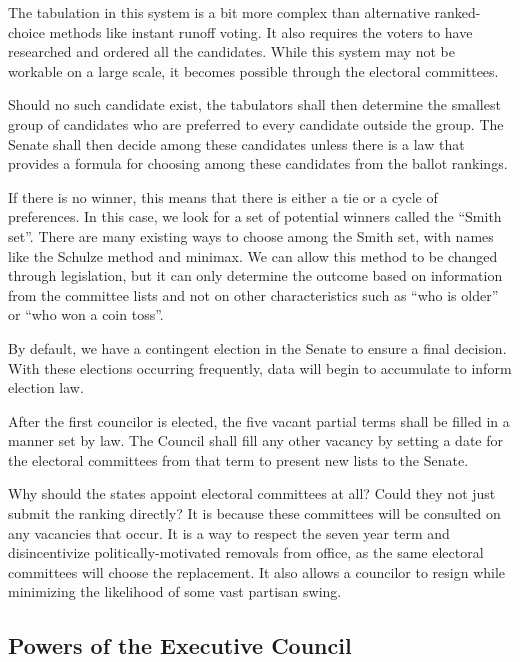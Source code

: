 \documentclass{article}
\newcommand{\quotes}[1]{``#1''}
\begin{document}
The tabulation in this system is a bit more complex than alternative ranked-choice methods like instant runoff voting. It also requires the voters to have researched and ordered all the candidates. While this system may not be workable on a large scale, it becomes possible through the electoral committees.

\begin{quoting}
Should no such candidate exist, the tabulators shall then determine the smallest group of candidates who are preferred to every candidate outside the group. The Senate shall then decide among these candidates unless there is a law that provides a formula for choosing among these candidates from the ballot rankings.
\end{quoting}

If there is no winner, this means that there is either a tie or a cycle of preferences. In this case, we look for a set of potential winners called the \quotes{Smith set}\cite{Smith_Set}. There are many existing ways to choose among the Smith set, with names like the Schulze method\cite{Schulze} and minimax. We can allow this method to be changed through legislation, but it can only determine the outcome based on information from the committee lists and not on other characteristics such as \quotes{who is older} or \quotes{who won a coin toss}.

By default, we have a contingent election in the Senate to ensure a final decision. With these elections occurring frequently, data will begin to accumulate to inform election law.

\begin{quoting}
After the first councilor is elected, the five vacant partial terms shall be filled in a manner set by law. The Council shall fill any other vacancy by setting a date for the electoral committees from that term to present new lists to the Senate.
\end{quoting}

Why should the states appoint electoral committees at all? Could they not just submit the ranking directly? It is because these committees will be consulted on any vacancies that occur. It is a way to respect the seven year term and disincentivize politically-motivated removals from office, as the same electoral committees will choose the replacement. It also allows a councilor to resign while minimizing the likelihood of some vast partisan swing.

\subsection{Powers of the Executive Council}
\end{document}

